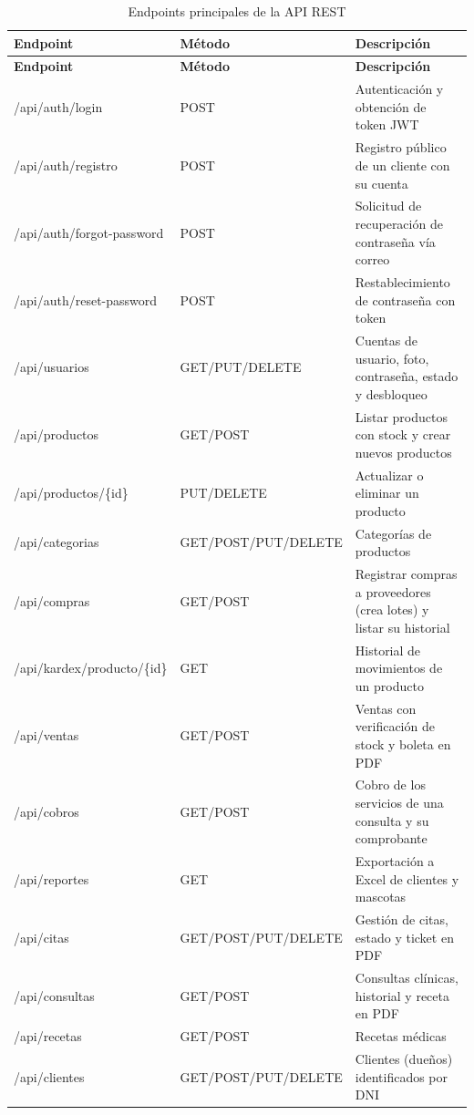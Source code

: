 \documentclass[11pt,a4paper]{report}
\begin{document}
\begin{longtable}{@{}>{\raggedright\arraybackslash}p{4.9cm} >{\raggedright\arraybackslash}p{2.6cm} p{7.5cm}@{}}
\caption{Endpoints principales de la API REST}\label{tab:endpoints}\\
\toprule
\textbf{Endpoint} & \textbf{Método} & \textbf{Descripción} \\
\midrule
\endfirsthead
\toprule
\textbf{Endpoint} & \textbf{Método} & \textbf{Descripción} \\
\midrule
\endhead
\bottomrule
\endfoot
/api/auth/login & POST & Autenticación y obtención de token JWT \\
/api/auth/registro & POST & Registro público de un cliente con su cuenta \\
/api/auth/forgot-password & POST & Solicitud de recuperación de contraseña vía correo \\
/api/auth/reset-password & POST & Restablecimiento de contraseña con token \\
/api/usuarios & GET/\allowbreak PUT/\allowbreak DELETE & Cuentas de usuario, foto, contraseña, estado y desbloqueo \\
/api/productos & GET/\allowbreak POST & Listar productos con stock y crear nuevos productos \\
/api/productos/\{id\} & PUT/\allowbreak DELETE & Actualizar o eliminar un producto \\
/api/categorias & GET/\allowbreak POST/\allowbreak PUT/\allowbreak DELETE & Categorías de productos \\
/api/compras & GET/\allowbreak POST & Registrar compras a proveedores (crea lotes) y listar su historial \\
/api/kardex/producto/\{id\} & GET & Historial de movimientos de un producto \\
/api/ventas & GET/\allowbreak POST & Ventas con verificación de stock y boleta en PDF \\
/api/cobros & GET/\allowbreak POST & Cobro de los servicios de una consulta y su comprobante \\
/api/reportes & GET & Exportación a Excel de clientes y mascotas \\
/api/citas & GET/\allowbreak POST/\allowbreak PUT/\allowbreak DELETE & Gestión de citas, estado y ticket en PDF \\
/api/consultas & GET/\allowbreak POST & Consultas clínicas, historial y receta en PDF \\
/api/recetas & GET/\allowbreak POST & Recetas médicas \\
/api/clientes & GET/\allowbreak POST/\allowbreak PUT/\allowbreak DELETE & Clientes (dueños) identificados por DNI \\

\end{longtable}
\end{document}
